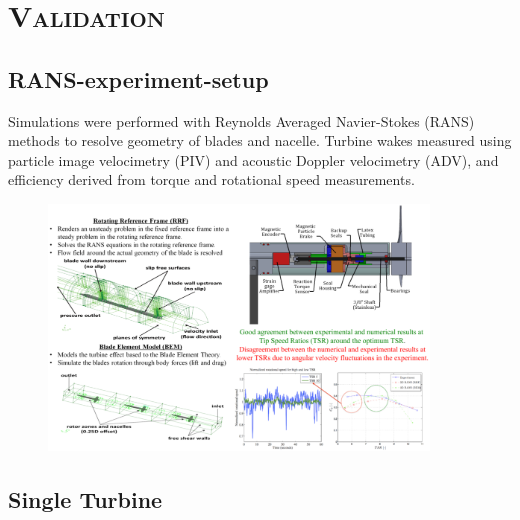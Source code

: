 \documentclass[xcolor=x11names,compress]{beamer}
\renewcommand{\(}{\begin{columns}}
\renewcommand{\)}{\end{columns}}
\newcommand{\<}[1]{\begin{column}{#1}}
\renewcommand{\>}{\end{column}}
\begin{document}
\section{\scshape Validation}

\subsection{RANS-experiment-setup}
	
	\begin{frame}{}

		\scriptsize Simulations were performed with Reynolds Averaged Navier-Stokes (RANS) methods 
		to resolve geometry of blades and nacelle. Turbine wakes measured using
		particle image velocimetry (PIV) and acoustic Doppler velocimetry (ADV), and efficiency derived from
		torque and rotational speed measurements. \footnotemark


		\vspace{-10pt}

		\begin{figure}[p]
		    \centering
		    \includegraphics[width=0.9\textwidth]{figures/validation-RANS-experiment-setup.png}
		    \label{fig:RANS-and-experiment-setup}
		\end{figure}

	\end{frame}


\subsection{Single Turbine}
	
\end{document}
